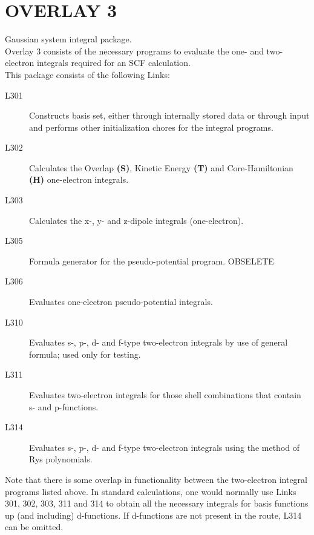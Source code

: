 \section{\sf OVERLAY 3}
Gaussian system integral package.  \\
Overlay 3 consists of the necessary programs to evaluate the one-
and two-electron integrals required for an SCF calculation. \\
This
package consists of the following Links:
\begin{description}
\item[L301]   Constructs basis set, either through internally stored data or
through input and performs other initialization chores for the
integral programs.
\item[L302]   Calculates the Overlap {\bf (S)}, 
Kinetic Energy  {\bf (T)} and Core-Hamiltonian {\bf (H)}
one-electron integrals.
\item[L303]   Calculates the x-, y- and z-dipole integrals (one-electron).
\item[L305]   Formula generator for the pseudo-potential program. OBSELETE
\item[L306]   Evaluates one-electron pseudo-potential integrals.
\item[L310]   Evaluates s-, p-, d- and f-type two-electron integrals by use of
general formula; used only for testing.
\item[L311]   Evaluates two-electron integrals for those shell combinations
that contain s- and p-functions.
\item[L314]   Evaluates s-, p-, d- and f-type two-electron integrals using the
method of Rys polynomials.
\end{description}
Note that there is some overlap in functionality between the
two-electron integral programs listed above. In standard calculations,
one would normally use Links 301, 302, 303, 311 and 314 to obtain all
the necessary integrals for basis functions up (and including)
d-functions. If d-functions are not present in the route, L314 can be
omitted.

